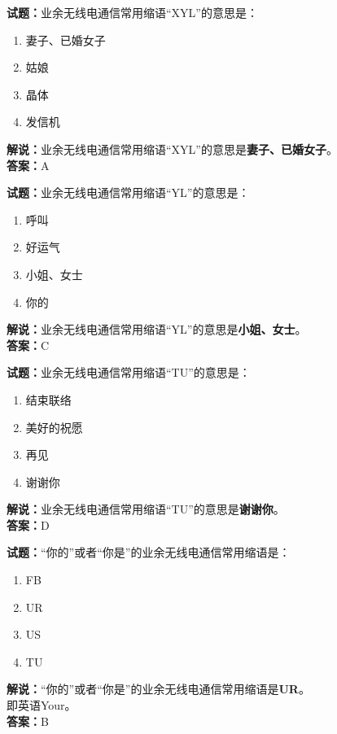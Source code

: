 \documentclass{ctexbook}
\begin{document}
\bigskip


\noindent\textbf{试题：}业余无线电通信常用缩语“XYL”的意思是：
\begin{enumerate}[leftmargin=3em]
\item 妻子、已婚女子
\item 姑娘
\item 晶体
\item 发信机
\end{enumerate}
\noindent\textbf{解说：}业余无线电通信常用缩语“XYL”的意思是\textbf{妻子、已婚女子}。\\\noindent\textbf{答案：}A



\bigskip


\noindent\textbf{试题：}业余无线电通信常用缩语“YL”的意思是：
\begin{enumerate}[leftmargin=3em]
\item 呼叫
\item 好运气
\item 小姐、女士
\item 你的
\end{enumerate}
\noindent\textbf{解说：}业余无线电通信常用缩语“YL”的意思是\textbf{小姐、女士}。\\\noindent\textbf{答案：}C




\bigskip


\noindent\textbf{试题：}业余无线电通信常用缩语“TU”的意思是：
\begin{enumerate}[leftmargin=3em]
\item 结束联络
\item 美好的祝愿
\item 再见
\item 谢谢你
\end{enumerate}
\noindent\textbf{解说：}业余无线电通信常用缩语“TU”的意思是\textbf{谢谢你}。\\\noindent\textbf{答案：}D



\bigskip


\noindent\textbf{试题：}“你的”或者“你是”的业余无线电通信常用缩语是：
\begin{enumerate}[leftmargin=3em]
\item FB
\item UR
\item US
\item TU
\end{enumerate}
\noindent\textbf{解说：}“你的”或者“你是”的业余无线电通信常用缩语是\textbf{UR}。\\即英语Your。\\\noindent\textbf{答案：}B
\end{document}
